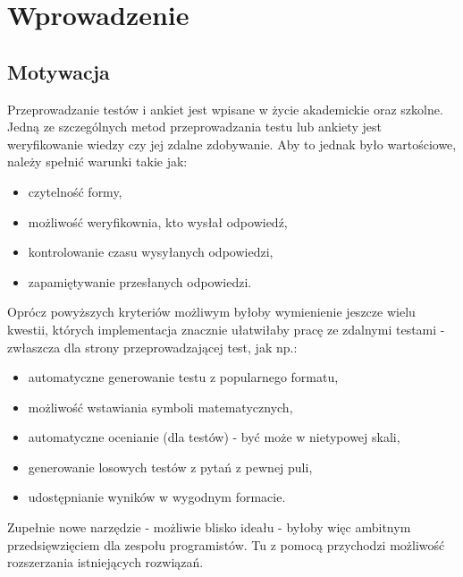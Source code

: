 \chapter{Wprowadzenie}%
\section{Motywacja}
Przeprowadzanie testów i ankiet jest wpisane w życie akademickie oraz szkolne. Jedną ze szczególnych metod przeprowadzania testu lub ankiety jest weryfikowanie wiedzy czy jej zdalne zdobywanie.
Aby to jednak było wartościowe, należy spełnić warunki takie jak:
\begin{itemize}
\item czytelność formy,
\item możliwość weryfikownia, kto wysłał odpowiedź,
\item kontrolowanie czasu wysyłanych odpowiedzi,
\item zapamiętywanie przesłanych odpowiedzi.
\end{itemize}
Oprócz powyższych kryteriów możliwym byłoby wymienienie jeszcze wielu kwestii, których implementacja znacznie ułatwiłaby pracę ze zdalnymi testami - zwłaszcza dla strony przeprowadzającej test, jak np.:
\begin{itemize}
\item automatyczne generowanie testu z popularnego formatu,
\item możliwość wstawiania symboli matematycznych,
\item automatyczne ocenianie (dla testów)  - być może w nietypowej skali,
\item generowanie losowych testów z pytań z pewnej puli,
\item udostępnianie wyników w wygodnym formacie.
\end{itemize}
Zupełnie nowe narzędzie - możliwie blisko ideału - byłoby więc ambitnym przedsięwzięciem dla zespołu programistów. Tu z pomocą przychodzi możliwość rozszerzania istniejących rozwiązań.

